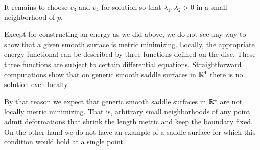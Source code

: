 \documentclass{article}
\begin{document}
It remains to choose $v_3$ and $v_4$ for solution so that $\lambda_1, \lambda_2>0$ in a small neighborhood of $p$.
\qeds

Except for constructing an energy as we did above,
we do not see any way to show that a given smooth surface is metric minimizing.
Locally, the appropriate energy functional can be described by three functions defined on the disc.
These three functions are subject to certain differential equations.
Straightforward computations show that on generic smooth saddle surfaces in $\mathbb{R}^4$ 
there is no solution even locally.

By that reason we expect that generic smooth saddle surfaces in $\mathbb{R}^4$ are not locally metric minimizing. 
That is, arbitrary small neighborhoods of any point admit deformations that shrink 
the length metric and keep the boundary fixed.
On the other hand we do not have an example of a saddle surface for which this condition would hold at a single point.
\end{document}
